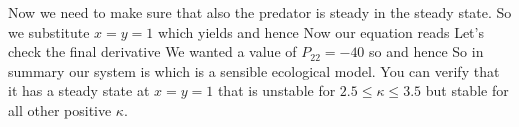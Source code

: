 Now we need to make sure that also the predator is steady in the steady state. So we substitute $x=y=1$ which yields 
and hence 
Now our equation reads 
Let's check the final derivative 
We wanted a value of $P_{22}=-40$ so 
and hence 
So in summary our system is 
which is a sensible ecological model. You can verify that it has a steady state at $x=y=1$ that is unstable for $2.5\leq\kappa\leq3.5$ but stable for all other positive $\kappa$. 
 
